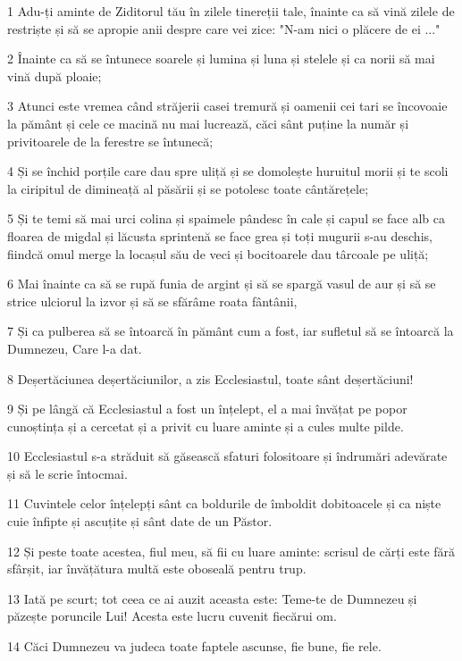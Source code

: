 \par 1 Adu-ți aminte de Ziditorul tău în zilele tinereții tale, înainte ca să vină zilele de restriște și să se apropie anii despre care vei zice: "N-am nici o plăcere de ei ..."
\par 2 Înainte ca să se întunece soarele și lumina și luna și stelele și ca norii să mai vină după ploaie;
\par 3 Atunci este vremea când străjerii casei tremură și oamenii cei tari se încovoaie la pământ și cele ce macină nu mai lucrează, căci sânt puține la număr și privitoarele de la ferestre se întunecă;
\par 4 Și se închid porțile care dau spre uliță și se domolește huruitul morii și te scoli la ciripitul de dimineață al păsării și se potolesc toate cântărețele;
\par 5 Și te temi să mai urci colina și spaimele pândesc în cale și capul se face alb ca floarea de migdal și lăcusta sprintenă se face grea și toți mugurii s-au deschis, fiindcă omul merge la locașul său de veci și bocitoarele dau târcoale pe uliță;
\par 6 Mai înainte ca să se rupă funia de argint și să se spargă vasul de aur și să se strice ulciorul la izvor și să se sfărâme roata fântânii,
\par 7 Și ca pulberea să se întoarcă în pământ cum a fost, iar sufletul să se întoarcă la Dumnezeu, Care l-a dat.
\par 8 Deșertăciunea deșertăciunilor, a zis Ecclesiastul, toate sânt deșertăciuni!
\par 9 Și pe lângă că Ecclesiastul a fost un înțelept, el a mai învățat pe popor cunoștința și a cercetat și a privit cu luare aminte și a cules multe pilde.
\par 10 Ecclesiastul s-a străduit să găsească sfaturi folositoare și îndrumări adevărate și să le scrie întocmai.
\par 11 Cuvintele celor înțelepți sânt ca boldurile de îmboldit dobitoacele și ca niște cuie înfipte și ascuțite și sânt date de un Păstor.
\par 12 Și peste toate acestea, fiul meu, să fii cu luare aminte: scrisul de cărți este fără sfârșit, iar învățătura multă este oboseală pentru trup.
\par 13 Iată pe scurt; tot ceea ce ai auzit aceasta este: Teme-te de Dumnezeu și păzește poruncile Lui! Acesta este lucru cuvenit fiecărui om.
\par 14 Căci Dumnezeu va judeca toate faptele ascunse, fie bune, fie rele.



